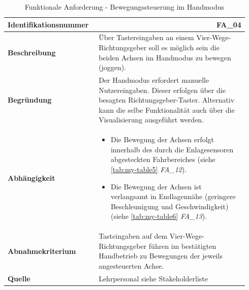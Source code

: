 \documentclass[../../../Bachelorarbeit.tex]{subfiles}
\begin{document}
\begin{table}[H]
    \centering
    \begin{tabular}{ p{0.34\linewidth}  p{0.6\linewidth} } 
        \hline
        \textbf{Identifikationsnummer}  & \multicolumn{1}{r}{FA\_04} \\ \hline
        \textbf{Beschreibung}           & Über Tastereingaben an einem Vier-Wege-Richtungsgeber soll es möglich sein die beiden Achsen im Handmodus zu bewegen (joggen). \\
        \textbf{Begründung}             & Der Handmodus erfordert manuelle Nutzereingaben. Dieser erfolgen über die besagten Richtungsgeber-Taster. Alternativ kann die selbe Funktionalität auch über die Visualisierung ausgeführt werden. \\
        \textbf{Abhängigkeit}           &   {\begin{itemize}[noitemsep,topsep=0pt,parsep=0pt,partopsep=0pt,leftmargin=*]
                                                \item Die Bewegung der Achsen erfolgt innerhalb des durch die Enlagesensoren abgesteckten Fahrbereiches (siehe \autoref{tab:my-table5} \textit{FA\_12}).
                                                \item Die Bewegung der Achsen ist verlangsamt in Endlagennähe (geringere Beschleunigung und Geschwindigkeit) (siehe \autoref{tab:my-table6} \textit{FA\_13}).
                                            \end{itemize}} \\
        \textbf{Abnahmekriterium}       & Tasteingaben auf dem Vier-Wege-Richtungsgeber führen im bestätigten Handbetrieb zu Bewegungen der jeweils angesteuerten Achse. \\
        \textbf{Quelle}                 & Lehrpersonal siehe Stakeholderliste \\ \hline
    \end{tabular}
    \caption[\acs{fa} - Bewegungssteuerung im Handmodus]{Funktionale Anforderung - Bewegungssteuerung im Handmodus}
    \label{tab:my-table2.6}
\end{table}
\end{document}
